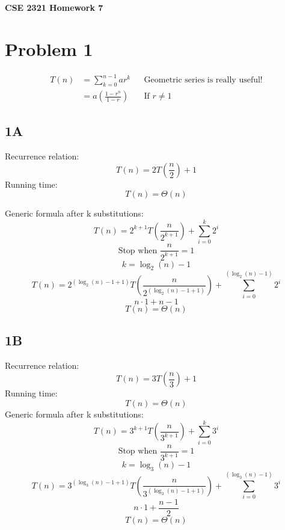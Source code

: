 \documentclass[14pt]{extarticle}
\begin{document}
\textbf{CSE 2321 Homework 7}

\section*{Problem 1}

\begin{align*}
T(n) &= \sum_{k=0}^{n-1} ar^k && \text{Geometric series is really useful!}  \\
&= a \left( \frac{1 - r^n}{1 - r} \right) && \text{If } r \neq 1
\end{align*}

\subsection*{1A}

Recurrence relation:
$$T(n) = 2T\left(\frac{n}{2}\right) + 1$$
Running time:
$$T(n) = \Theta(n)$$

Generic formula after k substitutions:
\begin{equation}
T(n) = 2^{k+1}T\left(\frac{n}{2^{k+1}}\right) + \sum_{i=0}^{k} 2^i
\end{equation}
$$\text{Stop when } \frac{n}{2^{k+1}} = 1$$
$$k = \log_2(n) - 1$$
\begin{equation}
T(n) = 2^{(\log_2(n) - 1 + 1)}T\left(\frac{n}{2^{(\log_2(n) - 1 + 1)}}\right) + \sum_{i=0}^{(\log_2(n) - 1)} 2^i
\end{equation}
$$n \cdot 1 + n - 1$$
$$T(n) = \Theta(n)$$

\subsection*{1B}
Recurrence relation:
$$T(n) = 3T\left(\frac{n}{3}\right) + 1$$
Running time:
$$T(n) = \Theta(n)$$
Generic formula after k substitutions:
\begin{equation}
T(n) = 3^{k+1}T\left(\frac{n}{3^{k+1}}\right) + \sum_{i=0}^{k} 3^i
\end{equation}
$$\text{Stop when } \frac{n}{3^{k+1}} = 1$$
$$k = \log_3(n) - 1$$
\begin{equation}
T(n) = 3^{(\log_3(n) - 1 + 1)}T\left(\frac{n}{3^{(\log_3(n) - 1 + 1)}}\right) + \sum_{i=0}^{(\log_3(n) - 1)} 3^i
\end{equation}
$$n \cdot 1 + \frac{n-1}{2}$$
$$T(n) = \Theta(n)$$
\end{document}
